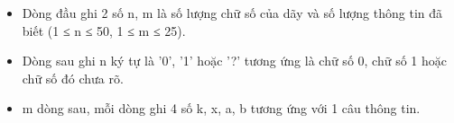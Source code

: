 \begin{itemize}
	\item Dòng đầu ghi 2 số n, m là số lượng chữ số của dãy và số lượng thông tin đã biết (1 ≤ n ≤ 50, 1 ≤ m ≤ 25).
	\item Dòng sau ghi n ký tự là '0', '1' hoặc '?' tương ứng là chữ số 0, chữ số 1 hoặc chữ số đó chưa rõ.
	\item m dòng sau, mỗi dòng ghi 4 số k, x, a, b tương ứng với 1 câu thông tin.
\end{itemize}